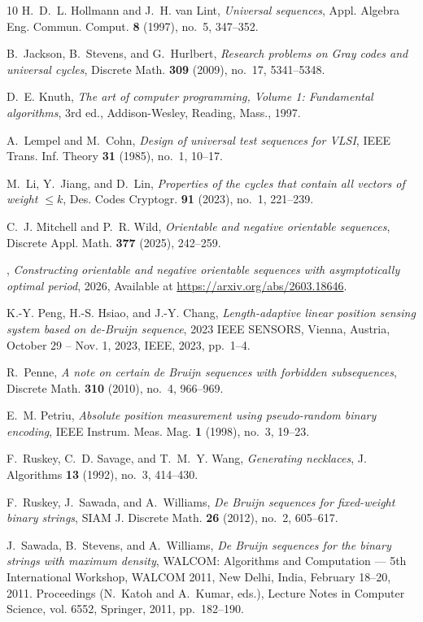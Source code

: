 \documentclass[a4paper,11pt]{article}
\theoremstyle{plain}
\theoremstyle{definition}
\theoremstyle{remark}
\begin{document}
\begin{thebibliography}{10}
 H.~D.~L. Hollmann and J.~H. {van Lint}, \emph{Universal sequences}, Appl.
  Algebra Eng. Commun. Comput. \textbf{8} (1997), no.~5, 347--352.

 B.~Jackson, B.~Stevens, and G.~Hurlbert, \emph{Research problems on {Gray}
  codes and universal cycles}, Discrete Math. \textbf{309} (2009), no.~17,
  5341--5348.

 D.~E. Knuth, \emph{The art of computer programming, {Volume} 1: {Fundamental}
  algorithms}, 3rd ed., Addison-Wesley, Reading, Mass., 1997.

 A.~Lempel and M.~Cohn, \emph{Design of universal test sequences for {VLSI}},
  {IEEE} Trans. Inf. Theory \textbf{31} (1985), no.~1, 10--17.

 M.~Li, Y.~Jiang, and D.~Lin, \emph{Properties of the cycles that contain all
  vectors of weight {$\le k$}}, Des. Codes Cryptogr. \textbf{91} (2023), no.~1,
  221--239.

 C.~J. Mitchell and P.~R. Wild, \emph{Orientable and negative orientable
  sequences}, Discrete Appl. Math. \textbf{377} (2025), 242--259.

 \bysame, \emph{Constructing orientable and negative orientable sequences
    with
  asymptotically optimal period}, 2026, Available at
  \url{https://arxiv.org/abs/2603.18646}.

 K.-Y. Peng, H.-S. Hsiao, and J.-Y. Chang, \emph{Length-adaptive linear
    position
  sensing system based on de-{Bruijn} sequence}, 2023 {IEEE} SENSORS, Vienna,
  Austria, October 29 -- Nov. 1, 2023, {IEEE}, 2023, pp.~1--4.

 R.~Penne, \emph{A note on certain de {Bruijn} sequences with forbidden
  subsequences}, Discrete Math. \textbf{310} (2010), no.~4, 966--969.

 E.~M. Petriu, \emph{Absolute position measurement using pseudo-random binary
  encoding}, IEEE Instrum. Meas. Mag. \textbf{1} (1998), no.~3, 19--23.

 F.~Ruskey, C.~D. Savage, and T.~M.~Y. Wang, \emph{Generating necklaces}, J.
  Algorithms \textbf{13} (1992), no.~3, 414--430.

 F.~Ruskey, J.~Sawada, and A.~Williams, \emph{De {Bruijn} sequences for
  fixed-weight binary strings}, {SIAM} J. Discrete Math. \textbf{26} (2012),
  no.~2, 605--617.

 J.~Sawada, B.~Stevens, and A.~Williams, \emph{De {Bruijn} sequences for the
  binary strings with maximum density}, {WALCOM:} Algorithms and Computation
  --- 5th International Workshop, {WALCOM} 2011, New Delhi, India, February
  18--20, 2011. Proceedings (N.~Katoh and A.~Kumar, eds.), Lecture Notes in
  Computer Science, vol. 6552, Springer, 2011, pp.~182--190.


\end{thebibliography}
\end{document}
